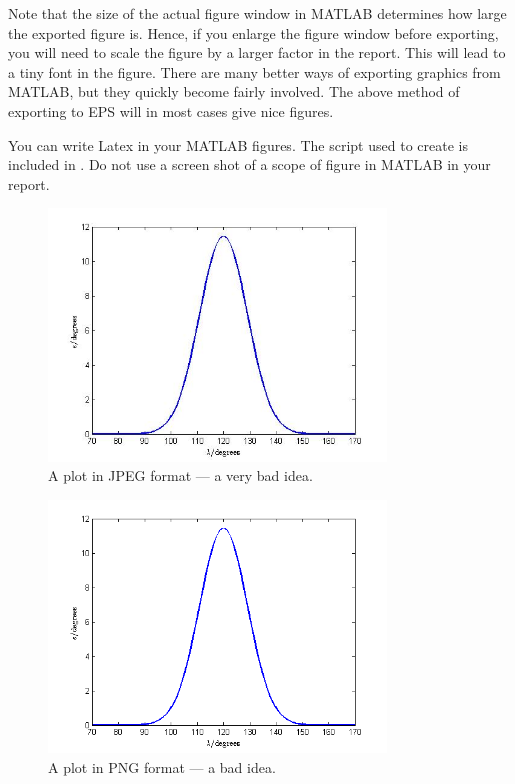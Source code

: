 Note that the size of the actual figure window in MATLAB determines how large the exported figure is. Hence, if you enlarge the figure window before exporting, you will need to scale the figure by a larger factor in the report. This will lead to a tiny font in the figure. There are many better ways of exporting graphics from MATLAB, but they quickly become fairly involved. The above method of exporting to EPS will in most cases give nice figures.

You can write Latex in your MATLAB figures. The script used to create  is included in . Do not use a screen shot of a scope of figure in MATLAB in your report.

\begin{figure}[htb]
	\centering
		\includegraphics[width=0.8\textwidth]{figures/constraint_jpg.jpg}
	\caption{A plot in JPEG format --- a very bad idea.}
\label{fig:constraint_jpg}
\end{figure}

\begin{figure}[htb]
	\centering
		\includegraphics[width=0.8\textwidth]{figures/constraint_png.png}
	\caption{A plot in PNG format --- a bad idea.}
\label{fig:constraint_png}
\end{figure}

